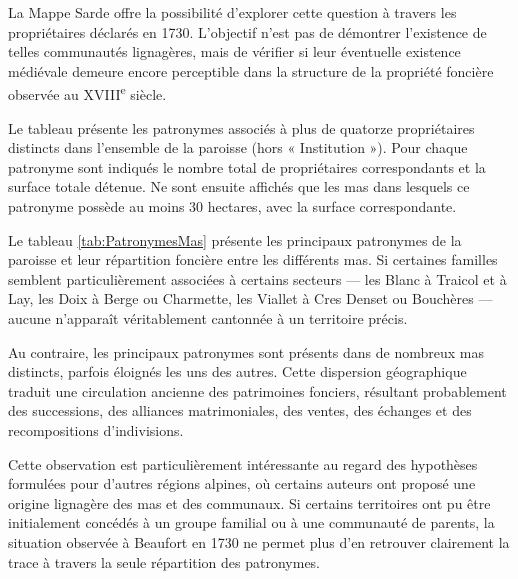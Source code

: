 \documentclass[12pt,a4paper]{report}
\begin{document}
La Mappe Sarde offre la possibilité d'explorer cette question à travers les propriétaires déclarés en 1730. L'objectif n'est pas de démontrer l'existence de telles communautés lignagères, mais de vérifier si leur éventuelle existence médiévale demeure encore perceptible dans la structure de la propriété foncière observée au XVIII\textsuperscript{e} siècle.

\begin{table}[H]
	\centering
	
	\caption{Principaux patronymes et répartition par mas}
	\label{tab:PatronymesMas}
\end{table}

Le tableau présente les patronymes associés à plus de quatorze propriétaires distincts dans l'ensemble de la paroisse (hors « Institution »). Pour chaque patronyme sont indiqués le nombre total de propriétaires correspondants et la surface totale détenue. Ne sont ensuite affichés que les mas dans lesquels ce patronyme possède au moins 30 hectares, avec la surface correspondante.

Le tableau \ref{tab:PatronymesMas} présente les principaux patronymes de la paroisse et leur répartition foncière entre les différents mas. Si certaines familles semblent particulièrement associées à certains secteurs — les Blanc à Traicol et à Lay, les Doix à Berge ou Charmette, les Viallet à Cres Denset ou Bouchères — aucune n'apparaît véritablement cantonnée à un territoire précis.

Au contraire, les principaux patronymes sont présents dans de nombreux mas distincts, parfois éloignés les uns des autres. Cette dispersion géographique traduit une circulation ancienne des patrimoines fonciers, résultant probablement des successions, des alliances matrimoniales, des ventes, des échanges et des recompositions d'indivisions.

Cette observation est particulièrement intéressante au regard des hypothèses formulées pour d'autres régions alpines, où certains auteurs ont proposé une origine lignagère des mas et des communaux. Si certains territoires ont pu être initialement concédés à un groupe familial ou à une communauté de parents, la situation observée à Beaufort en 1730 ne permet plus d'en retrouver clairement la trace à travers la seule répartition des patronymes.

\begin{table}[H]
	\centering
	
	\caption{Grands mas et principaux patronymes associés}
	\label{tab:MasPatronymes}
\end{table}
\end{document}
